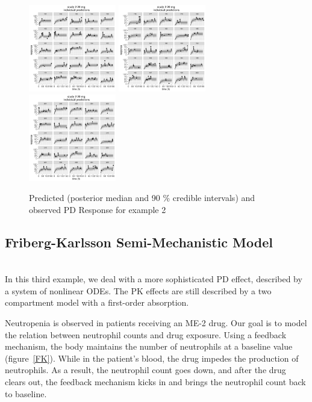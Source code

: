\documentclass[11pt]{amsart}
\begin{document}
\begin{figure}[htbp]
\includegraphics[width=1.5in,trim=0in 0in 0 0in]{graphics/effCptModelTorsten/effCptModelTorstenPlots024.pdf}
\includegraphics[width=1.5in,trim=0in 0in 0 0in]{graphics/effCptModelTorsten/effCptModelTorstenPlots025.pdf}
\includegraphics[width=1.5in,trim=0in 0in 0 0in]{graphics/effCptModelTorsten/effCptModelTorstenPlots026.pdf}
\caption{{Predicted (posterior median and 90 \% credible intervals) and observed PD Response for example 2}}
\label{effCptModelPredictionsPD}
\end{figure}

\clearpage

\subsection{Friberg-Karlsson Semi-Mechanistic Model \cite{2364}} \ \\ 

In this third example, we deal with a more sophisticated PD effect, described by a system of nonlinear ODEs. The PK effects are still described by a two compartment model with a first-order absorption. 

Neutropenia is observed in patients receiving an ME-2 drug. Our goal is to model the relation between neutrophil counts and drug exposure. Using a feedback mechanism, the body maintains the number of neutrophils at a baseline value (figure~\ref{FK}). While in the patient's blood, the drug impedes the production of neutrophils. As a result, the neutrophil count goes down, and after  the drug clears out, the feedback mechanism kicks in and brings the neutrophil count back to baseline.
\end{document}
